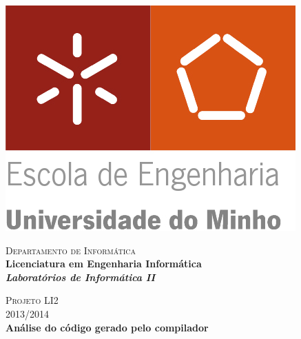\begin{titlepage}


\begin{minipage}{0.3\textwidth}
\begin{flushleft} 
\includegraphics[width=\textwidth]{./report/logo.png}
\end{flushleft}
\end{minipage}
\begin{minipage}{0.6\textwidth}
\begin{flushright} 

\textsc{Departamento de Informática}\\[0.1cm]
\bfseries Licenciatura em Engenharia Informática \\ [0.1cm]
\bfseries \textit{Laboratórios de Informática II}\\[8mm]

\end{flushright}
\end{minipage}


\vspace{3cm}


\begin{center}



\textsc{\LARGE Projeto LI2}\\
\textsc{\large 2013/2014}\\[1.5cm]

{ \Large \bfseries Análise do código gerado pelo compilador \\[2cm] }






\end{center}
\end{titlepage}

